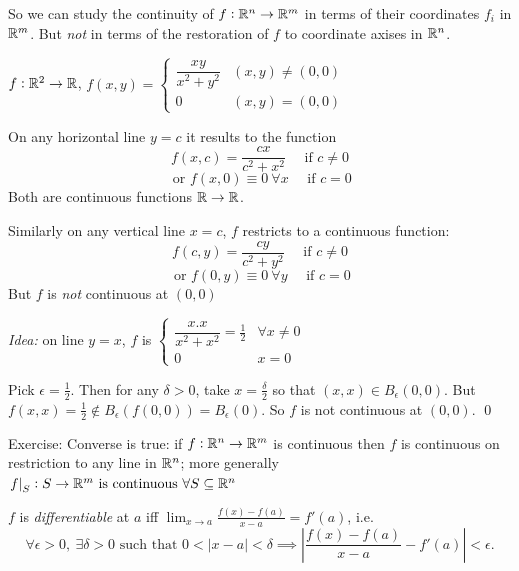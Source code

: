 \documentclass[twoside]{scrartcl}
\begin{document}
So we can study the continuity of $f: \mathbb{R}^n \to \mathbb{R}^m$ in terms of their coordinates $f_i$ in $\mathbb{R}^m$. But \emph{not} in terms of the restoration of $f$ to coordinate axises in $\mathbb{R}^n$.\vspace*{15pt}

\begin{example}
$f: \mathbb{R}^2 \to \mathbb{R}$, $f(x,y) = \begin{cases}
 	\dfrac{xy}{x^2 + y^2} & (x,y) \neq (0,0)\\
 	0 & (x,y) = (0,0)
 \end{cases}$
 
 On any horizontal line $y =c$ it results to the function 
 \[f(x,c) = \frac{cx}{c^2 + x^2} \quad \text{ if } c \neq 0\]
 \[\text{ or } f(x,0) \equiv 0 ~\forall x \quad \text{ if } c = 0\]
 Both are continuous functions $\mathbb{R} \to \mathbb{R}$. 
 
 Similarly on any vertical line $x = c$, $f$ restricts to a continuous function: 
  \[f(c,y) = \frac{cy}{c^2 + y^2} \quad \text{ if } c \neq 0\]
 \[\text{ or } f(0,y) \equiv 0 ~\forall y \quad \text{ if } c = 0\]
 But $f$ is \emph{not} continuous at $(0,0)$
 
 \emph{Idea:} on line $y=x$, $f$ is $\begin{cases}
	\dfrac{x.x}{x^2 + x^2} = \frac{1}{2} & \forall x \neq 0\\
	0 & x = 0
\end{cases}$

Pick $\epsilon = \frac{1}{2}$. Then for any $\delta > 0$, take $x = \frac{\delta}{2}$ so that $(x,x) \in B_\epsilon(0,0)$. But $f(x,x) = \frac{1}{2} \not\in B_\epsilon(f(0,0)) = B_\epsilon(0)$. So $f$ is not continuous at $(0,0)$. \qed
\end{example}

Exercise: Converse is true: if $f: \mathbb{R}^n \to \mathbb{R}^m$ is continuous then $f$ is continuous on restriction to any line in $\mathbb{R}^n$; more generally $\left.f\right|_S: S \to \mathbb{R}^m \text{ is continuous } \forall S \subseteq \mathbb{R}^n$





\pagebreak

\label{sub:differentiation}

\vspace*{5pt}

\begin{definition}
$f$ is \emph{differentiable}  at $a$ iff $\lim_{x\to a} \frac{f(x)-f(a)}{x-a} = f'(a)$, i.e.
\[\forall \epsilon > 0,~\exists \delta > 0\text{ such that } 0<|x-a| < \delta \implies \left|\frac{f(x)-f(a)}{x-a}-f'(a)\right| < \epsilon.\]	
\end{definition}
\end{document}
